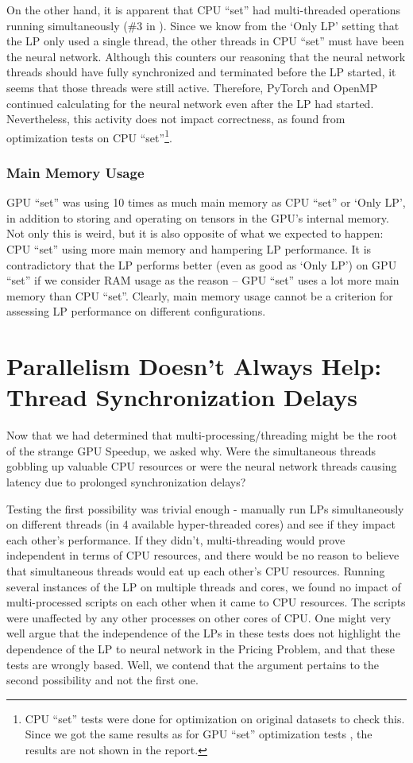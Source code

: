 On the other hand, it is apparent that CPU ``set'' had multi-threaded operations running simultaneously (\#3 in ). Since we know from the `Only LP' setting that the LP only used a single thread, the other threads in CPU ``set'' must have been the neural network. Although this counters our reasoning that the neural network threads should have fully synchronized and terminated before the LP started, it seems that those threads were still active. Therefore, PyTorch and OpenMP continued calculating for the neural network even after the LP had started. Nevertheless, this activity does not impact correctness, as found from optimization tests on CPU ``set''\footnote{CPU ``set'' tests were done for optimization on original datasets to check this. Since we got the same results as for GPU ``set'' optimization tests , the results are not shown in the report.}.

\subsubsection{Main Memory Usage}
GPU ``set'' was using 10 times as much main memory as CPU ``set'' or `Only LP', in addition to storing and operating on tensors in the GPU's internal memory. Not only this is weird, but it is also opposite of what we expected to happen: CPU ``set'' using more main memory and hampering LP performance. It is contradictory that the LP performs better (even as good as `Only LP') on GPU ``set'' if we consider RAM usage as the reason -- GPU ``set'' uses a lot more main memory than CPU ``set''. Clearly, main memory usage cannot be a criterion for assessing LP performance on different configurations.

\section{Parallelism Doesn't Always Help: Thread Synchronization Delays} \label{app:Parallelism Doesn't Always Help}
Now that we had determined that multi-processing/threading might be the root of the strange GPU Speedup, we asked why. Were the simultaneous threads gobbling up valuable CPU resources or were the neural network threads causing latency due to prolonged synchronization delays?

Testing the first possibility was trivial enough - manually run LPs simultaneously on different threads (in 4 available hyper-threaded cores) and see if they impact each other's performance. If they didn't, multi-threading would prove independent in terms of CPU resources, and there would be no reason to believe that simultaneous threads would eat up each other's CPU resources. Running several instances of the LP on multiple threads and cores, we found no impact of multi-processed scripts on each other when it came to CPU resources. The scripts were unaffected by any other processes on other cores of CPU. One might very well argue that the independence of the LPs in these tests does not highlight the dependence of the LP to neural network in the Pricing Problem, and that these tests are wrongly based. Well, we contend that the argument pertains to the second possibility and not the first one. 

